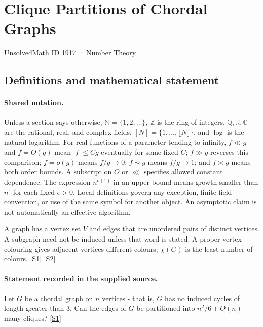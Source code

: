 \documentclass[11pt,a4paper]{article}
\newcommand{\N}{\mathbb{N}}
\newcommand{\Z}{\mathbb{Z}}
\newcommand{\Q}{\mathbb{Q}}
\newcommand{\R}{\mathbb{R}}
\newcommand{\C}{\mathbb{C}}
\newcommand{\sref}[2]{\hyperlink{source:#1:#2}{[S#2]}}
\begin{document}

\setcounter{section}{1916}

\section{Clique Partitions of Chordal Graphs}\label{1917}

{\small\sffamily UnsolvedMath ID 1917 · Number Theory}

\subsection{Definitions and mathematical statement}

\paragraph{Shared notation.}Unless a section says otherwise, $\N=\{1,2,\ldots\}$,
$\Z$ is the ring of integers, $\Q,\R,\C$ are the rational, real, and complex
fields, $[N]=\{1,\ldots,\lfloor N\rfloor\}$, and $\log$ is the natural
logarithm. For real functions of a parameter tending to infinity,
$f\ll g$ and $f=O(g)$ mean $|f|\leq Cg$ eventually for some fixed $C$;
$f\gg g$ reverses this comparison; $f=o(g)$ means $f/g\to0$;
$f\sim g$ means $f/g\to1$; and $f\asymp g$ means both order bounds.
A subscript on $O$ or $\ll$ specifies allowed constant dependence.
The expression $n^{o(1)}$ in an upper bound means growth smaller than
$n^\epsilon$ for each fixed $\epsilon>0$. Local definitions govern any
exception, finite-field convention, or use of the same symbol for another
object. An asymptotic claim is not automatically an effective algorithm.



A graph has a vertex set $V$ and edges that are unordered pairs of distinct vertices. A subgraph need not be induced unless that word is stated. A proper vertex colouring gives adjacent vertices different colours; $\chi(G)$ is the least number of colours. \sref{1917}{1} \sref{1917}{2}

\paragraph{Statement recorded in the supplied source.}
Let $G$ be a chordal graph on $n$ vertices - that is, $G$ has no induced cycles of length greater than $3$. Can the edges of $G$ be partitioned into $n^2/6+O(n)$ many cliques? \sref{1917}{1}
\end{document}
